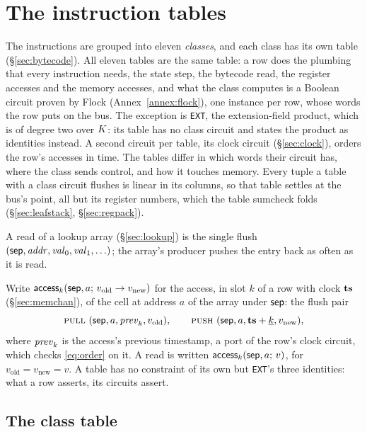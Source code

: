 \section{The instruction tables}\label{sec:tables}

The instructions are grouped into eleven \emph{classes}, and each class has its own table (\S\ref{sec:bytecode}). All eleven tables are the same table: a row does the plumbing that every instruction needs, the state step, the bytecode read, the register accesses and the memory accesses, and what the class computes is a Boolean circuit proven by Flock (Annex~\ref{annex:flock}), one instance per row, whose words the row puts on the bus. The exception is \texttt{EXT}, the extension-field product, which is of degree two over $K$: its table has no class circuit and states the product as identities instead. A second circuit per table, its clock circuit (\S\ref{sec:clock}), orders the row's accesses in time. The tables differ in which words their circuit has, where the class sends control, and how it touches memory. Every tuple a table with a class circuit flushes is linear in its columns, so that table settles at the bus's point, all but its register numbers, which the table sumcheck folds (\S\ref{sec:leafstack}, \S\ref{sec:regpack}).

A read of a lookup array (\S\ref{sec:lookup}) is the single flush \pull\ $\tup{\sep,\addr,\val_0,\val_1,\dots}$; the array's producer pushes the entry back as often as it is read.

Write $\mathsf{access}_{k}( \mathsf{sep},a;\,v_{\mathrm{old}}\to v_{\mathrm{new}} )$ for the access, in slot $k$ of a row with clock $\mathbf{ts}$ (\S\ref{sec:memchan}), of the cell at address $a$ of the array under $\mathsf{sep}$: the flush pair
\[
  \pull\ \tup{\sep,a,\tsprev_k,v_{\mathrm{old}}},\qquad \push\ \tup{\sep,a,\ts+\intk{k},v_{\mathrm{new}}},
\]
where $\mathit{prev}_k$ is the access's previous timestamp, a port of the row's clock circuit, which checks \eqref{eq:order} on it. A read is written $\mathsf{access}_{k}( \mathsf{sep},a;\,v )$, for $v_{\mathrm{old}}=v_{\mathrm{new}}=v$. A table has no constraint of its own but \texttt{EXT}'s three identities: what a row asserts, its circuits assert.

\subsection{The class table}\label{sec:tab-class}

